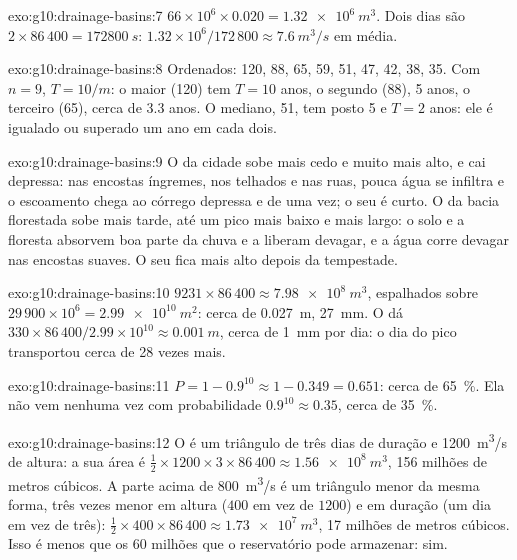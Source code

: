 \begin{solution}{exo:g10:drainage-basins:7}
$66 \times 10^6 \times 0.020 = \qty{1.32e6}{m^3}$. Dois dias são
$2 \times 86\,400 = \qty{172800}{s}$: $1.32 \times 10^6/172\,800 \approx
\qty{7.6}{m^3/s}$ em média.
\end{solution}

\begin{solution}{exo:g10:drainage-basins:8}
Ordenados: 120, 88, 65, 59, 51, 47, 42, 38, 35. Com $n = 9$, $T = 10/m$: o
maior (120) tem $T = 10$ anos, o segundo (88), 5 anos, o terceiro (65),
cerca de 3.3 anos. O mediano, 51, tem posto 5 e $T = 2$ anos: ele é igualado
ou superado um ano em cada dois.
\end{solution}

\begin{solution}{exo:g10:drainage-basins:9}
O  da cidade sobe mais cedo e muito mais alto, e cai depressa: nas
encostas íngremes, nos telhados e nas ruas, pouca água se infiltra e o
escoamento chega ao córrego depressa e de uma vez; o seu  é
curto. O  da bacia florestada sobe mais tarde, até um pico mais
baixo e mais largo: o solo e a floresta absorvem boa parte da chuva e a
liberam devagar, e a água corre devagar nas encostas suaves. O seu
 fica mais alto depois da tempestade.
\end{solution}

\begin{solution}{exo:g10:drainage-basins:10}
$9231 \times 86\,400 \approx \qty{7.98e8}{m^3}$, espalhados sobre
$29\,900 \times 10^6 = \qty{2.99e10}{m^2}$: cerca de \qty{0.027}{m},
\qty{27}{mm}. O  dá $330 \times 86\,400/2.99 \times 10^{10}
\approx \qty{0.001}{m}$, cerca de \qty{1}{mm} por dia: o dia do pico
transportou cerca de 28 vezes mais.
\end{solution}

\begin{solution}{exo:g10:drainage-basins:11}
$P = 1 - 0.9^{10} \approx 1 - 0.349 = 0.651$: cerca de \qty{65}{\percent}.
Ela não vem nenhuma vez com probabilidade $0.9^{10} \approx 0.35$, cerca de
\qty{35}{\percent}.
\end{solution}

\begin{solution}{exo:g10:drainage-basins:12}
O  é um triângulo de três dias de duração e \qty{1200}{m^3/s} de
altura: a sua área é $\tfrac12 \times 1200 \times 3 \times 86\,400 \approx
\qty{1.56e8}{m^3}$, \num{156} milhões de metros cúbicos. A parte acima de
\qty{800}{m^3/s} é um triângulo menor da mesma forma, três vezes menor em
altura ($400$ em vez de $1200$) e em duração (um dia em vez de três):
$\tfrac12 \times 400 \times 86\,400 \approx \qty{1.73e7}{m^3}$, \num{17}
milhões de metros cúbicos. Isso é menos que os \num{60} milhões que o
reservatório pode armazenar: sim.
\end{solution}

